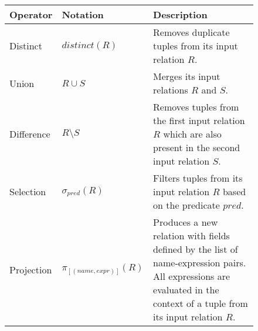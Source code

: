 \begin{figure}[htpb]
	\centering
	\begin{tabular}{@{}p{}p{}p{}@{}}
		\toprule
		Operator           & Notation                                                    & Description                                                                                                                                                                                                                                                                                                       \\
		\midrule
		Distinct           & \(\mathit{distinct}(R)\)                                    & Removes duplicate tuples from its input relation \(R\).                                                                                                                                                                                                                                                           \\
		Union              & \(R \cup S\)                                                & Merges its input relations \(R\) and \(S\).                                                                                                                                                                                                                                                                       \\
		Difference         & \(R \setminus S\)                                           & Removes tuples from the first input relation \(R\) which are also present in the second input relation \(S\).                                                                                                                                                                                                     \\
		Selection          & \(\sigma_{\mathit{pred}}(R)\)                               & Filters tuples from its input relation \(R\) based on the predicate \(\mathit{pred}\).                                                                                                                                                                                                                            \\
		Projection         & \(\pi_{[(\mathit{name},\mathit{expr})]}(R)\)                & Produces a new relation with fields defined by the list of name-expression pairs. All expressions are evaluated in the context of a tuple from its input relation \(R\).                                                                                                                                          \\

\end{tabular}
\end{figure}
